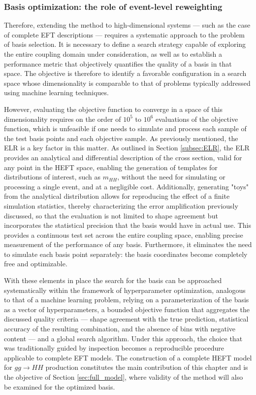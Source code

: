 \subsubsection{Basis optimization: the role of event-level reweighting}
Therefore, extending the method to high-dimensional systems — such as the case of complete EFT descriptions — requires a systematic approach to the problem of basis selection. It is necessary to define a search strategy capable of exploring the entire coupling domain under consideration, as well as to establish a performance metric that objectively quantifies the quality of a basis in that space. The objective is therefore to identify a favorable configuration in a search space whose dimensionality is comparable to that of problems typically addressed using machine learning techniques.

However, evaluating the objective function to converge in a space of this dimensionality requires on the order of $10^5$ to $10^6$ evaluations of the objective function, which is unfeasible if one needs to simulate and process each sample of the test basis points and each objective sample. As previously mentioned, the ELR is a key factor in this matter. As outlined in Section \ref{subsec:ELR}, the ELR provides an analytical and differential description of the cross section, valid for any point in the HEFT space, enabling the generation of templates for distributions of interest, such as $m_{HH}$, without the need for simulating or processing a single event, and at a negligible cost. Additionally, generating "toys" from the analytical distribution allows for reproducing the effect of a finite simulation statistics, thereby characterizing the error amplification previously discussed, so that the evaluation is not limited to shape agreement but incorporates the statistical precision that the basis would have in actual use. This provides a continuous test set across the entire coupling space, enabling precise measurement of the performance of any basis. Furthermore, it eliminates the need to simulate each basis point separately: the basis coordinates become completely free and optimizable.\medskip

With these elements in place the search for the basis can be approached systematically within the framework of hyperparameter optimization, analogous to that of a machine learning problem, relying on a parameterization of the basis as a vector of hyperparameters, a bounded objective function that aggregates the discussed quality criteria — shape agreement with the true prediction, statistical accuracy of the resulting combination, and the absence of bins with negative content — and a global search algorithm. Under this approach, the choice that was traditionally guided by inspection becomes a reproducible procedure applicable to complete EFT models. The construction of a complete HEFT model for $gg\to HH$ production constitutes the main contribution of this chapter and is the objective of Section \ref{sec:full_model}, where validity of the method will also be examined for the optimized basis.

